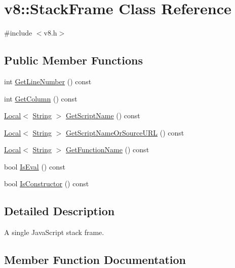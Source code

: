 \hypertarget{classv8_1_1_stack_frame}{}\section{v8\+:\+:Stack\+Frame Class Reference}
\label{classv8_1_1_stack_frame}


{\ttfamily \#include $<$v8.\+h$>$}

\subsection*{Public Member Functions}
\begin{DoxyCompactItemize}
\item 
int \hyperlink{classv8_1_1_stack_frame_a57886e590ac1a4c57ee6f6bf1009b5b1}{Get\+Line\+Number} () const 
\item 
int \hyperlink{classv8_1_1_stack_frame_a44eccfb1bf17221ab6f69e977f3aa3a2}{Get\+Column} () const 
\item 
\hyperlink{classv8_1_1_local}{Local}$<$ \hyperlink{classv8_1_1_string}{String} $>$ \hyperlink{classv8_1_1_stack_frame_ac9701a5687dd04bcf24fd02f62bbe1a8}{Get\+Script\+Name} () const 
\item 
\hyperlink{classv8_1_1_local}{Local}$<$ \hyperlink{classv8_1_1_string}{String} $>$ \hyperlink{classv8_1_1_stack_frame_ac9f436f4cb245d871fe7efce03edc0cc}{Get\+Script\+Name\+Or\+Source\+U\+R\+L} () const 
\item 
\hyperlink{classv8_1_1_local}{Local}$<$ \hyperlink{classv8_1_1_string}{String} $>$ \hyperlink{classv8_1_1_stack_frame_ac13cdea4b4253d82485e673de6264073}{Get\+Function\+Name} () const 
\item 
bool \hyperlink{classv8_1_1_stack_frame_ae45f4d6ff9398a00a0b6534c160ec0c7}{Is\+Eval} () const 
\item 
bool \hyperlink{classv8_1_1_stack_frame_ade01313f4a3f6b88691d9d544737f65c}{Is\+Constructor} () const 
\end{DoxyCompactItemize}


\subsection{Detailed Description}
A single Java\+Script stack frame. 

\subsection{Member Function Documentation}
\hypertarget{classv8_1_1_stack_frame_a44eccfb1bf17221ab6f69e977f3aa3a2}{}
